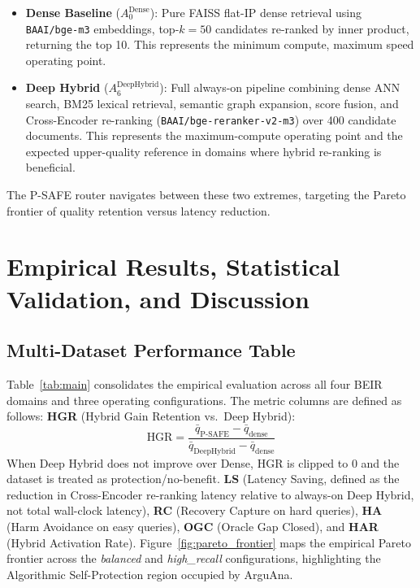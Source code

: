 \documentclass[journal]{IEEEtran}
\begin{document}
\begin{itemize}
  \item \textbf{Dense Baseline} ($A_0^{\text{Dense}}$): Pure
        FAISS flat-IP dense retrieval using
        \texttt{BAAI/bge-m3} embeddings, top-$k=50$ candidates
        re-ranked by inner product, returning the top 10.
        This represents the minimum compute, maximum speed
        operating point.
  \item \textbf{Deep Hybrid} ($A_6^{\text{DeepHybrid}}$): Full
        always-on pipeline combining dense ANN search,
        BM25 lexical retrieval, semantic graph expansion, score
        fusion, and Cross-Encoder re-ranking
        (\texttt{BAAI/bge-reranker-v2-m3}) over 400 candidate
        documents. This represents the maximum-compute operating point and the
        expected upper-quality reference in domains where hybrid re-ranking is beneficial.
\end{itemize}

The P-SAFE router navigates between these two extremes,
targeting the Pareto frontier of quality retention versus
latency reduction.

\section{Empirical Results, Statistical Validation, and Discussion}
\label{sec:results}
\subsection{Multi-Dataset Performance Table}
\label{sec:maintable}

Table~\ref{tab:main} consolidates the empirical evaluation across
all four BEIR domains and three operating configurations.
The metric columns are defined as follows:
\textbf{HGR} (Hybrid Gain Retention vs.\ Deep Hybrid):
\begin{equation}
\text{HGR} = \frac{\bar{q}_{\text{P-SAFE}} - \bar{q}_{\text{dense}}}{\bar{q}_{\text{DeepHybrid}} - \bar{q}_{\text{dense}}}
\end{equation}
When Deep Hybrid does not improve over Dense, HGR is clipped to 0 and the dataset is treated as protection/no-benefit.
\textbf{LS} (Latency Saving, defined as the reduction in Cross-Encoder
re-ranking latency relative to always-on Deep Hybrid, not total wall-clock latency),
\textbf{RC} (Recovery Capture on hard queries),
\textbf{HA} (Harm Avoidance on easy queries),
\textbf{OGC} (Oracle Gap Closed), and
\textbf{HAR} (Hybrid Activation Rate).
Figure~\ref{fig:pareto_frontier} maps the empirical Pareto
frontier across the \textit{balanced} and \textit{high\_recall}
configurations, highlighting the Algorithmic Self-Protection
region occupied by ArguAna.
\end{document}
